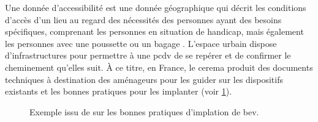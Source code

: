 \newpar{}


Une donnée d'accessibilité est une donnée géographique qui décrit les conditions d'accès d'un lieu au regard des nécessités des personnes ayant des besoins spécifiques, comprenant les personnes en situation de handicap, mais également les personnes avec une poussette ou un bagage \cite{Ding2014}. L'espace urbain dispose d'infrastructures pour permettre à une \gls{pcdv} de se repérer et de confirmer le cheminement qu'elles suit. À ce titre, en France, le \gls{cerema} produit des documents techniques à destination des aménageurs pour les guider sur les dispositifs existants et les bonnes pratiques pour les implanter (voir \ref{fig:ea_exemple_cerema_bev}). 

\begin{figure}
    \centering
    \caption{Exemple issu de \cite{CEREMA2022} sur les bonnes pratiques d'implation de \gls{bev}.}
    \label{fig:ea_exemple_cerema_bev}
\end{figure}


\newpar{}


